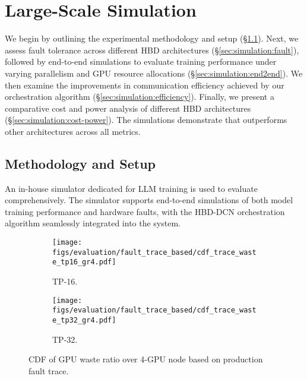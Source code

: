 \section{Large-Scale Simulation}
\label{sec:simulation}

We begin by outlining the experimental methodology and setup (\S\ref{sec:simulation:setup}). Next, we assess fault tolerance across different HBD architectures (\S\ref{sec:simulation:fault}), followed by end-to-end simulations to evaluate training performance under varying parallelism and GPU resource allocations (\S\ref{sec:simulation:end2end}). We then examine the improvements in communication efficiency achieved by our orchestration algorithm (\S\ref{sec:simulation:efficiency}). Finally, we present a comparative cost and power analysis of different HBD architectures (\S\ref{sec:simulation:cost-power}). The simulations demonstrate that \sys{} outperforms other architectures across all metrics. 

 

\vspace{-1ex}
\subsection{Methodology and Setup}
\label{sec:simulation:setup}


An in-house simulator dedicated for LLM training is used to evaluate \sys comprehensively. The simulator supports end-to-end simulations of both model training performance and hardware faults, with the HBD-DCN orchestration algorithm seamlessly integrated into the system.

\begin{figure}[h!t]
    \centering
    \begin{subfigure}[b]{0.23\textwidth}
        \centering
        \texttt{[image: figs/evaluation/fault\_trace\_based/cdf\_trace\_waste\_tp16\_gr4.pdf]}
        \vspace{-1em}
        \caption{TP-16.}
        \label{fig:simulation:waste-cdf:tp16-gr8}
    \end{subfigure}
    \hspace{2pt}
    \begin{subfigure}[b]{0.23\textwidth}
        \centering
        \texttt{[image: figs/evaluation/fault\_trace\_based/cdf\_trace\_waste\_tp32\_gr4.pdf]}
        \vspace{-1em}
        \caption{TP-32.}
        \label{fig:simulation:waste-cdf:tp32-gr8}
    \end{subfigure}
    \vspace{-2em}
    \caption{CDF of GPU waste ratio over 4-GPU node based on production fault trace.}
    \vspace{-1em}
    \label{fig:simulation:waste-cdf:gr4}
\end{figure}




